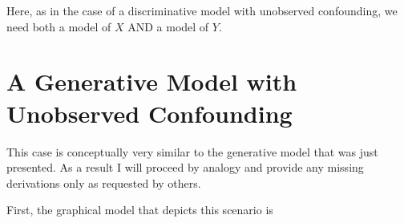 \documentclass{article}
\begin{document}
Here, as in the case of a discriminative model with unobserved confounding, we need both a model of $X$ AND a model of $Y$.

\section{A Generative Model with Unobserved Confounding}
This case is conceptually very similar to the generative model that was just presented. As a result I will proceed by analogy and provide any missing derivations only as requested by others.

First, the graphical model that depicts this scenario is
\begin{center}
\end{center}
\end{document}
